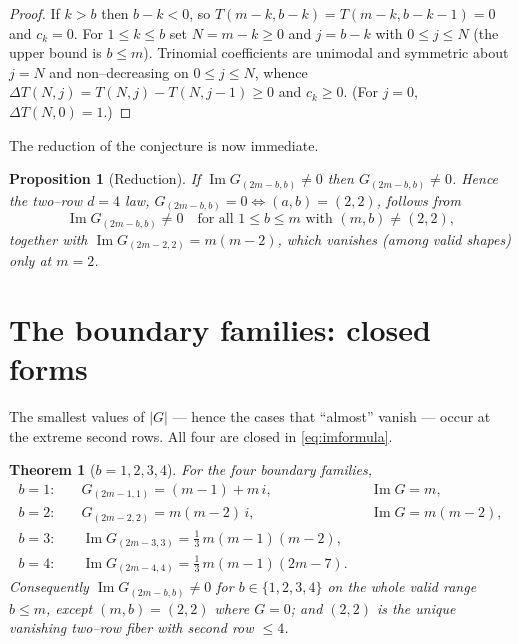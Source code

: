 \documentclass[11pt]{article}
\newtheorem{theorem}{Theorem}
\newtheorem{proposition}{Proposition}
\theoremstyle{definition}
\renewcommand{\Im}{\operatorname{Im}}
\newcommand{\im}{\Im}
\begin{document}
\begin{proof}
If $k>b$ then $b-k<0$, so $T(m-k,b-k)=T(m-k,b-k-1)=0$ and $c_k=0$.  For
$1\le k\le b$ set $N=m-k\ge0$ and $j=b-k$ with $0\le j\le N$ (the upper bound is
$b\le m$).  Trinomial coefficients are unimodal and symmetric about $j=N$ and
non--decreasing on $0\le j\le N$, whence $\Delta T(N,j)=T(N,j)-T(N,j-1)\ge0$ and
$c_k\ge0$.  (For $j=0$, $\Delta T(N,0)=1$.)
\end{proof}

The reduction of the conjecture is now immediate.

\begin{proposition}[Reduction]\label{prop:reduce}
If $\im G_{(2m-b,b)}\neq0$ then $G_{(2m-b,b)}\neq0$.  Hence the two--row
$d{=}4$ law, $G_{(2m-b,b)}=0\iff(a,b)=(2,2)$, follows from
\begin{equation}\label{eq:target}
   \im G_{(2m-b,b)}\neq0\quad\text{for all }1\le b\le m\text{ with }(m,b)\neq(2,2),
\end{equation}
together with $\im G_{(2m-2,2)}=m(m-2)$, which vanishes \textup(among valid
shapes\textup) only at $m=2$.
\end{proposition}

\section{The boundary families: closed forms}

The smallest values of $|G|$ — hence the cases that ``almost'' vanish — occur at
the extreme second rows.  All four are closed in \eqref{eq:imformula}.

\begin{theorem}[$b=1,2,3,4$]\label{thm:boundary}
For the four boundary families,
\[
\begin{aligned}
   b=1:&\quad G_{(2m-1,1)}=(m-1)+m\,i, &&\im G=m,\\
   b=2:&\quad G_{(2m-2,2)}=m(m-2)\,i, &&\im G=m(m-2),\\
   b=3:&\quad \im G_{(2m-3,3)}=\tfrac13\,m(m-1)(m-2),\\
   b=4:&\quad \im G_{(2m-4,4)}=\tfrac13\,m(m-1)(2m-7).
\end{aligned}
\]
Consequently $\im G_{(2m-b,b)}\neq0$ for $b\in\{1,2,3,4\}$ on the whole valid
range $b\le m$, except $(m,b)=(2,2)$ where $G=0$; and $(2,2)$ is the unique
vanishing two--row fiber with second row $\le4$.
\end{theorem}
\end{document}
